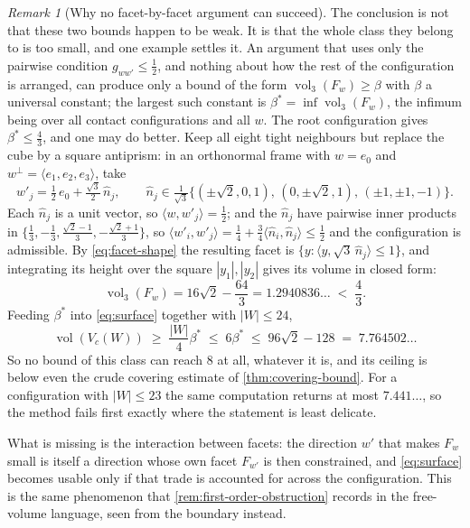 \documentclass[11pt,reqno]{amsart}
\renewcommand{\_}{\origunderscore\allowbreak}
\numberwithin{equation}{section}
\theoremstyle{plain}
\theoremstyle{definition}
\theoremstyle{remark}
\newtheorem{remark}[thm]{Remark}
\DeclareMathOperator{\vol}{vol}
\begin{document}
\begin{remark}[Why no facet-by-facet argument can succeed]
The conclusion is not that these two bounds happen to be weak. It is
that the whole class they belong to is too small, and one example settles
it. An argument that uses only the pairwise condition
$g_{ww'}\le\tfrac12$, and nothing about how the rest of the
configuration is arranged, can produce only a bound of the form
$\vol_3(F_w)\ge\beta$ with $\beta$ a universal constant; the largest
such constant is
$\beta^{*}=\inf\vol_3(F_w)$, the infimum being over all contact
configurations and all $w$. The root configuration gives
$\beta^{*}\le\tfrac43$, and one may do better. Keep all eight tight
neighbours but replace the cube by a square antiprism: in an orthonormal
frame with $w=e_0$ and $w^{\perp}=\langle e_1,e_2,e_3\rangle$, take
\begin{equation}\label{eq:antiprism}
  w'_j=\tfrac12\,e_0+\tfrac{\sqrt3}{2}\,\widehat n_j,
  \qquad
  \widehat n_j\in\tfrac{1}{\sqrt3}\bigl\{(\pm\sqrt2,0,1),\,
  (0,\pm\sqrt2,1),\,(\pm1,\pm1,-1)\bigr\}.
\end{equation}
Each $\widehat n_j$ is a unit vector, so
$\langle w,w'_j\rangle=\tfrac12$; and the $\widehat n_j$ have pairwise
inner products in
$\{\tfrac13,-\tfrac13,\tfrac{\sqrt2-1}{3},-\tfrac{\sqrt2+1}{3}\}$,
so $\langle w'_i,w'_j\rangle=\tfrac14+\tfrac34\langle\widehat
n_i,\widehat n_j\rangle\le\tfrac12$ and the configuration is
admissible. By \eqref{eq:facet-shape} the resulting facet is
$\{y:\langle y,\sqrt3\,\widehat n_j\rangle\le1\}$, and integrating
its height over the square $|y_1|,|y_2|$ gives its volume in closed
form:
\[
  \vol_3(F_w)=16\sqrt2-\frac{64}{3}=1.2940836\ldots\;<\;\frac43 .
\]
Feeding $\beta^{*}$ into \eqref{eq:surface} together with $|W|\le24$,
\[
  \vol(V_c(W))\;\ge\;\frac{|W|}{4}\beta^{*}
  \;\le\;6\beta^{*}\;\le\;96\sqrt2-128\;=\;7.764502\ldots
\]
So no bound of this class can reach $8$ at all, whatever it is, and its
ceiling is below even the crude covering estimate of
\cref{thm:covering-bound}. For a configuration with $|W|\le23$ the same
computation returns at most $7.441\ldots$, so the method fails first
exactly where the statement is least delicate.

What is missing is the interaction between facets: the direction $w'$
that makes $F_w$ small is itself a direction whose own facet $F_{w'}$ is
then constrained, and \eqref{eq:surface} becomes usable only if that
trade is accounted for across the configuration. This is the same
phenomenon that \cref{rem:first-order-obstruction} records in the
free-volume language, seen from the boundary instead.
\end{remark}
\end{document}

